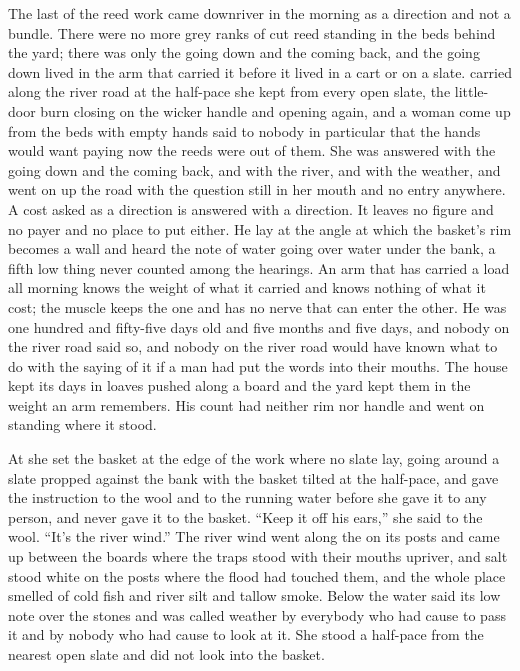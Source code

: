 
The last of the reed work came downriver in the morning as a direction and not a bundle. There were no more grey ranks of cut reed standing in the beds behind the yard; there was only the going down and the coming back, and the going down lived in the arm that carried it before it lived in a cart or on a slate.  carried  along the river road at the half-pace she kept from every open slate, the little-door burn closing on the wicker handle and opening again, and a woman come up from the beds with empty hands said to nobody in particular that the hands would want paying now the reeds were out of them. She was answered with the going down and the coming back, and with the river, and with the weather, and went on up the road with the question still in her mouth and no entry anywhere. A cost asked as a direction is answered with a direction. It leaves no figure and no payer and no place to put either. He lay at the angle at which the basket's rim becomes a wall and heard the note of water going over water under the bank, a fifth low thing never counted among the hearings. An arm that has carried a load all morning knows the weight of what it carried and knows nothing of what it cost; the muscle keeps the one and has no nerve that can enter the other. He was one hundred and fifty-five days old and five months and five days, and nobody on the river road said so, and nobody on the river road would have known what to do with the saying of it if a man had put the words into their mouths. The house kept its days in loaves pushed along a board and the yard kept them in the weight an arm remembers. His count had neither rim nor handle and went on standing where it stood.

At  she set the basket at the edge of the work where no slate lay, going around a slate propped against the bank with the basket tilted at the half-pace, and gave the instruction to the wool and to the running water before she gave it to any person, and never gave it to the basket. “Keep it off his ears,” she said to the wool. “It's the river wind.” The river wind went along the  on its posts and came up between the boards where the traps stood with their mouths upriver, and salt stood white on the posts where the flood had touched them, and the whole place smelled of cold fish and river silt and tallow smoke. Below  the water said its low note over the stones and was called weather by everybody who had cause to pass it and by nobody who had cause to look at it. She stood a half-pace from the nearest open slate and did not look into the basket.

